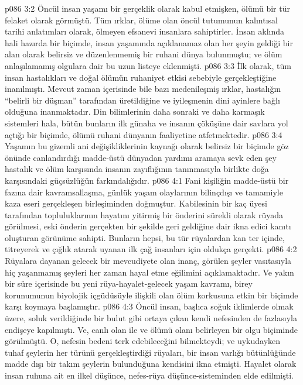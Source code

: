 \vs p086 3:2 Öncül insan yaşamı bir gerçeklik olarak kabul etmişken, ölümü bir tür felaket olarak görmüştü. Tüm ırklar, ölüme olan öncül tutumunun kalıntısal tarihi anlatımları olarak, ölmeyen efsanevi insanlara sahiptirler. İnsan aklında hali hazırda bir biçimde, insan yaşamında açıklanamaz olan her şeyin geldiği bir alan olarak belirsiz ve düzenlenmemiş bir ruhani dünya bulunmuştu; ve ölüm anlaşılamamış olgulara dair bu uzun listeye eklenmişti.
\vs p086 3:3 İlk olarak, tüm insan hastalıkları ve doğal ölümün ruhaniyet etkisi sebebiyle gerçekleştiğine inanılmıştı. Mevcut zaman içerisinde bile bazı medenileşmiş ırklar, hastalığın “belirli bir düşman” tarafından üretildiğine ve iyileşmenin dini ayinlere bağlı olduğuna inanmaktadır. Din bilimlerinin daha sonraki ve daha karmaşık sistemleri hala, bütün bunların ilk günaha ve insanın çöküşüne dair savlara yol açtığı bir biçimde, ölümü ruhani dünyanın faaliyetine atfetmektedir.
\vs p086 3:4 Yaşamın bu gizemli ani değişikliklerinin kaynağı olarak belirsiz bir biçimde göz önünde canlandırdığı madde\hyp{}üstü dünyadan yardımı aramaya sevk eden şey hastalık ve ölüm karşısında insanın zayıflığının tanınmasıyla birlikte doğa karşısındaki güçsüzlüğün farkındalığıdır.
\vs p086 4:1 Fani kişiliğin madde\hyp{}üstü bir fazına dair kavramsallaşma, günlük yaşam olaylarının bilinçdışı ve tamamiyle kaza eseri gerçekleşen birleşiminden doğmuştur. Kabilesinin bir kaç üyesi tarafından topluluklarının hayatını yitirmiş bir önderini sürekli olarak rüyada görülmesi, eski önderin gerçekten bir şekilde geri geldiğine dair ikna edici kanıtı oluşturan görünüme sahipti. Bunların hepsi, bu tür rüyalardan kan ter içinde, titreyerek ve çığlık atarak uyanan ilk çağ insanları için oldukça gerçekti.
\vs p086 4:2 Rüyalara dayanan gelecek bir mevcudiyete olan inanç, görülen şeyler vasıtasıyla hiç yaşanmamış şeyleri her zaman hayal etme eğilimini açıklamaktadır. Ve yakın bir süre içerisinde bu yeni rüya\hyp{}hayalet\hyp{}gelecek yaşam kavramı, birey korunumunun biyolojik içgüdüsüyle ilişkili olan ölüm korkusuna etkin bir biçimde karşı koymaya başlamıştır.
\vs p086 4:3 Öncül insan, başlıca soğuk iklimlerde olmak üzere, soluk verildiğinde bir bulut gibi ortaya çıkan kendi nefesinden de fazlasıyla endişeye kapılmıştı. Ve, canlı olan ile ve ölümü olanı belirleyen bir olgu biçiminde görülmüştü. O, nefesin bedeni terk edebileceğini bilmekteydi; ve uykudayken tuhaf şeylerin her türünü gerçekleştirdiği rüyaları, bir insan varlığı bütünlüğünde madde dışı bir takım şeylerin bulunduğuna kendisini ikna etmişti. Hayalet olarak insan ruhuna ait en ilkel düşünce, nefes\hyp{}rüya düşünce\hyp{}sisteminden elde edilmişti.
